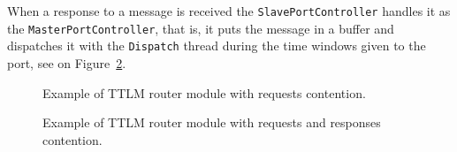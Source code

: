 When a response to a message is received the
\texttt{SlavePortController} handles it as the
\texttt{MasterPortController}, that is, it puts the message in a
buffer and dispatches it with the \texttt{Dispatch} thread during the
time windows given to the port, see {\large {}} on
Figure~\ref{fig:ttlm_router_adv2}.

\begin{figure}[p]
  \begin{center}
    
    \caption{\label{fig:ttlm_router_adv} Example of TTLM router module
      with requests contention.}
  \end{center}
\end{figure}

\begin{figure}[p]
  \begin{center}
    
    \caption{\label{fig:ttlm_router_adv2} Example of TTLM router
      module with requests and responses contention.}
  \end{center}
\end{figure}
